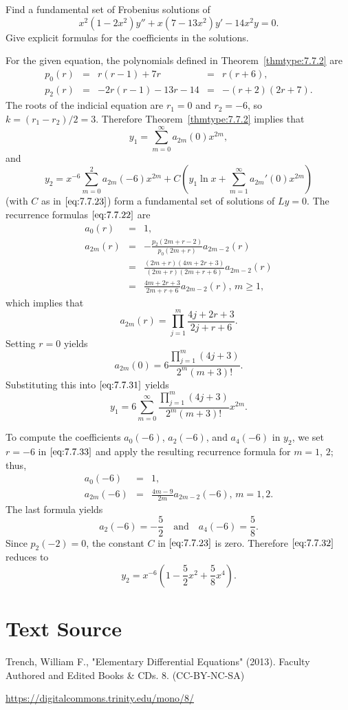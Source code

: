 \documentclass{ximera}
\begin{document}
\begin{example}\label{example:7.7.4}
Find a fundamental set of Frobenius  solutions of
$$
x^2(1-2x^2)y''+x(7-13x^2)y'-14x^2y=0.
$$
Give explicit formulas for the coefficients in the solutions.

\begin{explanation}
For  the given equation, the polynomials defined in
Theorem~\ref{thmtype:7.7.2} are
$$
\begin{array}{ccccc}
p_0(r)&=&r(r-1)+7r&=&r(r+6),\\
p_2(r)&=&-2r(r-1)-13r-14&=&-(r+2)(2r+7).
\end{array}
$$
The roots of the indicial equation are $r_1=0$ and $r_2=-6$,
so $k=(r_1-r_2)/2=3$. Therefore Theorem~\ref{thmtype:7.7.2} implies that
\begin{equation} \label{eq:7.7.31}
y_1=\sum_{m=0}^\infty a_{2m}(0)x^{2m},
\end{equation}
and
\begin{equation} \label{eq:7.7.32}
y_2=x^{-6}\sum_{m=0}^2a_{2m}(-6)x^{2m}+C\left(y_1\ln
x+\sum_{m=1}^\infty a_{2m}'(0)x^{2m}\right)
\end{equation}
(with $C$ as in $\eqref{eq:7.7.23}$)
form a fundamental set of
solutions of $Ly=0$. The recurrence formulas $\eqref{eq:7.7.22}$ are
\begin{equation} \label{eq:7.7.33}
\begin{array}{ccl}
a_0(r)&=&1,\\
a_{2m}(r)&=&-\frac{p_2(2m+r-2)}{p_0(2m+r)}a_{2m-2}(r)\\
&=&\frac{(2m+r)(4m+2r+3)}{(2m+r)(2m+r+6)}a_{2m-2}(r)\\
&=&\frac{4m+2r+3}{2m+r+6}a_{2m-2}(r),\,m\geq 1,
\end{array}
\end{equation}
which implies that
$$
a_{2m}(r)=\prod_{j=1}^m\frac{4j+2r+3}{2j+r+6}.
$$
Setting $r=0$  yields
$$
a_{2m}(0)=6\frac{\prod_{j=1}^m(4j+3)}{2^m(m+3)!}.
$$
Substituting this into $\eqref{eq:7.7.31}$ yields
$$
y_1=6\sum_{m=0}^\infty \frac{\prod_{j=1}^m(4j+3)}{2^m(m+3)!}x^{2m}.
$$

To compute the coefficients $a_0(-6)$, $a_2(-6)$, and $a_4(-6)$ in
$y_2$, we
set $r=-6$ in $\eqref{eq:7.7.33}$ and apply the resulting recurrence
formula for $m=1$, $2$;   thus,
\begin{eqnarray*}
a_0(-6)&=&1,\\
a_{2m}(-6)&=&\frac{4m-9}{2m}a_{2m-2}(-6),\,m=1,2.
\end{eqnarray*}
The last formula yields
$$
a_2(-6)=-\frac{5}{2}\quad\mbox{and}\quad a_4(-6)=\frac{5}{8}.
$$
Since $p_2(-2)=0$, the constant $C$ in $\eqref{eq:7.7.23}$ is zero.
Therefore $\eqref{eq:7.7.32}$ reduces to
$$
y_2=x^{-6}\left(1-\frac{5}{2}x^2+\frac{5}{8}x^4\right).
$$
\end{explanation}
\end{example}

\section*{Text Source}
Trench, William F., "Elementary Differential Equations" (2013). Faculty Authored and Edited Books \& CDs. 8. (CC-BY-NC-SA)

\href{https://digitalcommons.trinity.edu/mono/8/}{https://digitalcommons.trinity.edu/mono/8/}
\end{document}
